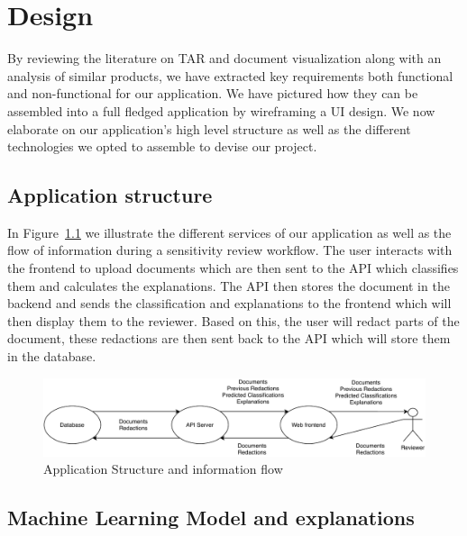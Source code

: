 \documentclass[\version]{l4proj}
\begin{document}
\chapter{Design}

By reviewing the literature on TAR and document visualization along with an analysis of similar products, we have extracted key requirements both functional and non-functional for our application.
We have pictured how they can be assembled into a full fledged application by wireframing a UI design.
We now elaborate on our application's high level structure as well as the different technologies we opted to assemble to devise our project.

\section{Application structure}

In Figure~\ref{fig:design_diagram} we illustrate the different services of our application as well as the flow of information during a sensitivity review workflow.
The user interacts with the frontend to upload documents which are then sent to the API which classifies them and calculates the explanations.
The API then stores the document in the backend and sends the classification and explanations to the frontend which will then display them to the reviewer.
Based on this, the user will redact parts of the document, these redactions are then sent back to the API which will store them in the database.

\begin{figure}[H]
    \centering
    \includegraphics[width=\textwidth]{figures/design_diagram.pdf}
    \caption{Application Structure and information flow}\label{fig:design_diagram}
\end{figure}

\section{Machine Learning Model and explanations}
\end{document}
